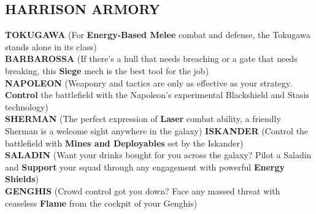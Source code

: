 \subsection*{HARRISON ARMORY}

\textbf{TOKUGAWA} (For \textbf{Energy-Based Melee} combat and defense, the Tokugawa stands alone in its class)\\
\textbf{BARBAROSSA} (If there’s a hull that needs breaching or a gate that needs breaking, this \textbf{Siege} mech is the best tool for the job)\\
\textbf{NAPOLEON} (Weaponry and tactics are only as effective as your strategy. \textbf{Control} the battlefield with the Napoleon’s experimental Blackshield and Stasis technology)\\ 
\textbf{SHERMAN} (The perfect expression of \textbf{Laser} combat ability, a friendly Sherman is a welcome sight anywhere in the galaxy)
\textbf{ISKANDER} (Control the battlefield with \textbf{Mines and Deployables} set by the Iskander)\\
\textbf{SALADIN} (Want your drinks bought for you across the galaxy? Pilot a Saladin and \textbf{Support} your squad through any engagement with powerful \textbf{Energy Shields})\\
\textbf{GENGHIS} (Crowd control got you down? Face any massed threat with ceaseless \textbf{Flame} from the cockpit of your Genghis) 
